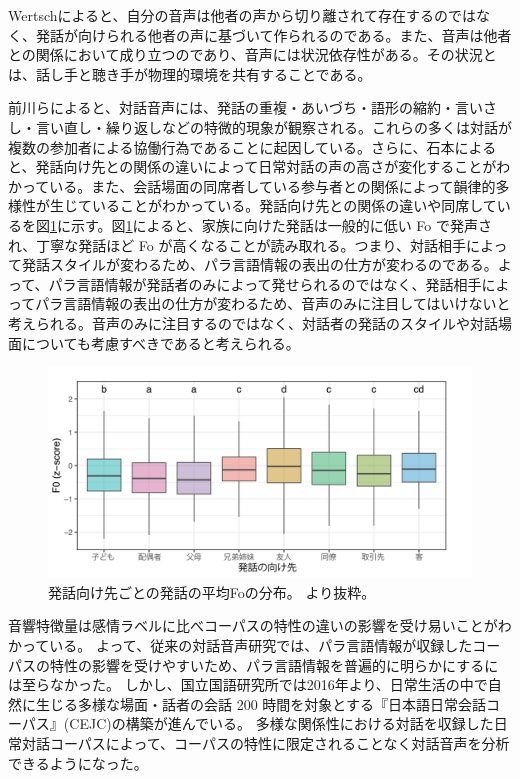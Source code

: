 Wertschによると、自分の音声は他者の声から切り離されて存在するのではなく、発話が向けられる他者の声に基づいて作られるのである。また、音声は他者との関係において成り立つのであり、音声には状況依存性がある\cite{wertsch}。その状況とは、話し手と聴き手が物理的環境を共有することである\cite{maekawa_onsei}。

前川らによると、対話音声には、発話の重複・あいづち・語形の縮約・言いさし・言い直し・繰り返しなどの特微的現象が観察される。これらの多くは対話が複数の参加者による協働行為であることに起因している\cite{maekawa_inritsu}。さらに、石本によると、発話向け先との関係の違いによって日常対話の声の高さが変化することがわかっている。また、会話場面の同席者している参与者との関係によって韻律的多様性が生じていることがわかっている\cite{ishimoto}。発話向け先との関係の違いや同席しているを図\ref{ishimoto1:fig}に示す。図\ref{ishimoto1:fig}によると、家族に向けた発話は一般的に低い Fo で発声され、丁寧な発話ほど Fo が高くなることが読み取れる。つまり、対話相手によって発話スタイルが変わるため、パラ言語情報の表出の仕方が変わるのである。よって、パラ言語情報が発話者のみによって発せられるのではなく、発話相手によってパラ言語情報の表出の仕方が変わるため、音声のみに注目してはいけないと考えられる。音声のみに注目するのではなく、対話者の発話のスタイルや対話場面についても考慮すべきであると考えられる。


\begin{figure}[hbtp]
 \centering
   \includegraphics[width=12.0cm]{figures/ishimoto1.png}
 \caption[発話向け先ごとの発話の平均Foの分布]{発話向け先ごとの発話の平均Foの分布。 \cite{ishimoto}より抜粋。 }
 \label{ishimoto1:fig}
\end{figure}



音響特徴量は感情ラベルに比べコーパスの特性の違いの影響を受け易いことがわかっている\cite{nagawaka_mori}。
よって、従来の対話音声研究では、パラ言語情報が収録したコーパスの特性の影響を受けやすいため、パラ言語情報を普遍的に明らかにするには至らなかった。
しかし、国立国語研究所では2016年より、日常生活の中で自然に生じる多様な場面・話者の会話 200 時間を対象とする『日本語日常会話コーパス』(CEJC)の構築が進んでいる\cite{koiso}。
多様な関係性における対話を収録した日常対話コーパスによって、コーパスの特性に限定されることなく対話音声を分析できるようになった。


